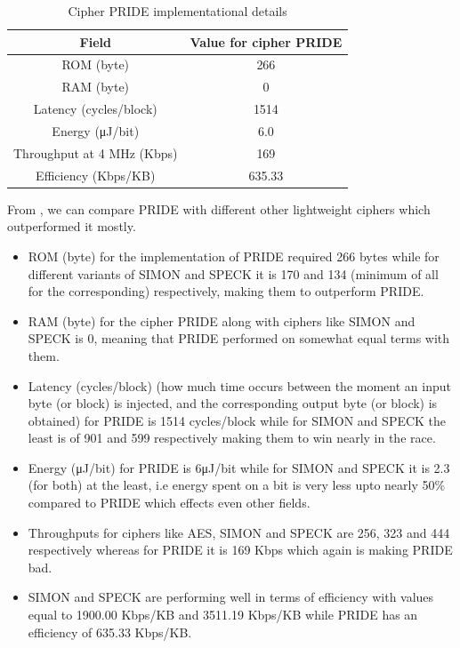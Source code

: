 \documentclass{transcrypto}
\begin{document}
	\begin{table}[H]
		\centering
		\begin{tabular}{|c|c|}
			\hline
			\textbf{Field} & \textbf{Value for cipher PRIDE}\\
			\hline
			ROM (byte) & 266\\ \hline
			RAM (byte) & 0\\ \hline
			Latency (cycles/block) & 1514\\ \hline
			Energy (μJ/bit) & 6.0\\ \hline
			Throughput at 4 MHz (Kbps) & 169\\ \hline
			Efficiency (Kbps/KB) & 635.33\\ \hline
		\end{tabular}
	\caption{Cipher PRIDE implementational details}
	\end{table}
	\newpage
	From \cite{Hatzivasilis2018}, we can compare PRIDE with different other lightweight ciphers which outperformed it mostly.
	\begin{itemize}
		\item ROM (byte) for the implementation of PRIDE required 266 bytes while for different variants of SIMON and SPECK it is 170 and 134 (minimum of all for the corresponding) respectively, making them to outperform PRIDE.
		\item RAM (byte) for the cipher PRIDE along with ciphers like SIMON and SPECK is 0, meaning that PRIDE performed on somewhat equal terms with them.
		\item Latency (cycles/block) (how much time occurs between the moment an input byte (or block) is injected, and the corresponding output byte (or block) is obtained) for PRIDE is 1514 cycles/block while for SIMON and SPECK the least is of 901 and 599 respectively making them to win nearly in the race.
		\item Energy (μJ/bit) for PRIDE is 6μJ/bit while for SIMON and SPECK it is 2.3 (for both) at the least, i.e energy spent on a bit is very less upto nearly 50\% compared to PRIDE which effects even other fields.
		\item Throughputs for ciphers like AES, SIMON and SPECK are 256, 323 and 444 respectively whereas for PRIDE it is 169 Kbps which again is making PRIDE bad.
		\item SIMON and SPECK are performing well in terms of efficiency with values equal to 1900.00 Kbps/KB and 3511.19 Kbps/KB while PRIDE has an efficiency of 635.33 Kbps/KB.
	\end{itemize}
	
\end{document}
